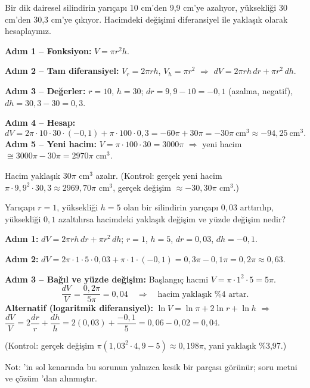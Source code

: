 \begin{soru}
Bir dik dairesel silindirin yarıçapı 10 cm'den 9,9 cm'ye azalıyor, yüksekliği 30 cm'den 30,3 cm'ye çıkıyor. Hacimdeki
değişimi diferansiyel ile yaklaşık olarak hesaplayınız.
\end{soru}
\begin{cevap}
\textbf{Adım 1 -- Fonksiyon:} $V=\pi r^2h$.

\textbf{Adım 2 -- Tam diferansiyel:} $V_r=2\pi rh$, $V_h=\pi r^2$ $\Rightarrow$ $dV=2\pi rh\,dr+\pi r^2\,dh$.

\textbf{Adım 3 -- Değerler:} $r=10$, $h=30$; $dr=9{,}9-10=-0{,}1$ (azalma, negatif), $dh=30{,}3-30=0{,}3$.

\textbf{Adım 4 -- Hesap:}
\[
dV=2\pi\cdot10\cdot30\cdot(-0{,}1)+\pi\cdot100\cdot0{,}3=-60\pi+30\pi=-30\pi\ \text{cm}^3\approx-94{,}25\ \text{cm}^3 .
\]
\textbf{Adım 5 -- Yeni hacim:} $V=\pi\cdot100\cdot30=3000\pi$ $\Rightarrow$ yeni hacim $\cong3000\pi-30\pi=2970\pi$ cm$^3$.

Hacim yaklaşık $30\pi$ cm$^3$ azalır. (Kontrol: gerçek yeni hacim $\pi\cdot9{,}9^2\cdot30{,}3\approx2969{,}70\pi$ cm$^3$,
gerçek değişim $\approx-30{,}30\pi$ cm$^3$.)
\end{cevap}

\begin{soru}
Yarıçapı $r=1$, yüksekliği $h=5$ olan bir silindirin yarıçapı $0{,}03$ arttırılıp, yüksekliği $0{,}1$ azaltılırsa
hacimdeki yaklaşık değişim ve yüzde değişim nedir?
\end{soru}
\begin{cevap}
\textbf{Adım 1:} $dV=2\pi rh\,dr+\pi r^2\,dh$; $r=1$, $h=5$, $dr=0{,}03$, $dh=-0{,}1$.

\textbf{Adım 2:} $dV=2\pi\cdot1\cdot5\cdot0{,}03+\pi\cdot1\cdot(-0{,}1)=0{,}3\pi-0{,}1\pi=0{,}2\pi\approx0{,}63$.

\textbf{Adım 3 -- Bağıl ve yüzde değişim:} Başlangıç hacmi $V=\pi\cdot1^2\cdot5=5\pi$.
\[ \frac{dV}{V}=\frac{0{,}2\pi}{5\pi}=0{,}04\quad\Rightarrow\quad\text{hacim yaklaşık \%4 artar.} \]
\textbf{Alternatif (logaritmik diferansiyel):} $\ln V=\ln\pi+2\ln r+\ln h$ $\Rightarrow$
$\dfrac{dV}{V}=2\dfrac{dr}{r}+\dfrac{dh}{h}=2(0{,}03)+\dfrac{-0{,}1}{5}=0{,}06-0{,}02=0{,}04$.

(Kontrol: gerçek değişim $\pi(1{,}03^2\cdot4{,}9-5)\approx0{,}198\pi$, yani yaklaşık \%3,97.)
\end{cevap}
Not: 'in sol kenarında bu sorunun yalnızca kesik bir parçası görünür; soru metni ve çözüm
'dan alınmıştır.

